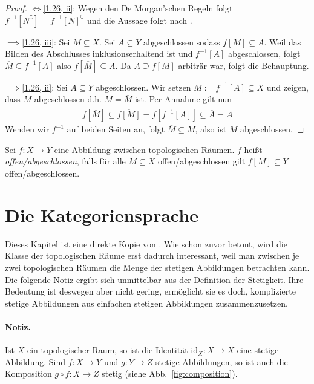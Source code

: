 \documentclass[
12pt, 
openany, 
a4paper, 
final,
fleqn, 
]{myclass}
\numberwithin{equation}{chapter}
\numberwithin{section}{chapter}
\newcommand{\implication}[2]{\glqq {#1}$\implies${#2}\grqq}
\newcommand{\doubleimplication}[2]{\glqq {#1}$\iff${#2}\grqq}
\newcommand{\closure}[1]{\overline{#1}}
\renewcommand{\cite}[2][]{}
\begin{document}
\begin{proof}
\doubleimplication{\ref{1.26, i}}{\ref{1.26, ii}}: Wegen den De Morgan'schen Regeln folgt $f^{-1}[N^\complement] = f^{-1}[N]^\complement$ und die Aussage folgt nach . 

\implication{\ref{1.26, ii}}{\ref{1.26, iii}}: Sei $M \subseteq X$. Sei $A\subseteq Y$ abgeschlossen sodass $f[M]\subseteq A$. Weil das Bilden des Abschlusses inklusionserhaltend ist und $f^{-1}[A]$ abgeschlossen, folgt $\closure{M} \subseteq f^{-1}[A]$ also $f[\closure{M}]\subseteq A$. Da $A\supseteq f[M]$ arbiträr war, folgt die Behauptung. 

\implication{\ref{1.26, iii}}{\ref{1.26, ii}}: Sei $A\subseteq Y$ abgeschlossen. Wir setzen $M:= f^{-1}[A]\subseteq X$ und zeigen, dass $M$ abgeschlossen d.h. $M=\closure{M}$ ist. Per Annahme gilt nun 
\begin{align*}
f[\closure{M}] \subseteq \closure{f[M]} = \closure{f[f^{-1}[A]]} \subseteq \closure{A} = A
\end{align*}
Wenden wir $f^{-1}$ auf beiden Seiten an, folgt $\closure{M} \subseteq M$, also ist $M$ abgeschlossen. \qedhere
\end{proof}

\begin{defn}
Sei $f: X\to Y$ eine Abbildung zwischen topologischen Räumen. $f$ heißt \emph{offen/abgeschlossen}, falls für alle $M\subseteq X$ offen/abgeschlossen gilt $f[M]\subseteq Y$ offen/abgeschlossen.
\end{defn}


\section{Die Kategoriensprache}

Dieses Kapitel ist eine direkte Kopie von \cite{laures_grundkurs_2023}.
Wie schon zuvor betont, wird die Klasse der topologischen Räume erst dadurch interessant, weil man zwischen je zwei topologischen Räumen die Menge der stetigen Abbildungen betrachten kann. Die folgende Notiz ergibt sich unmittelbar aus der Definition der Stetigkeit. Ihre Bedeutung ist deswegen aber nicht gering, ermöglicht sie es doch, komplizierte stetige Abbildungen aus einfachen stetigen Abbildungen zusammenzusetzen.

\paragraph{Notiz.} Ist \(X\) ein topologischer Raum, so ist die Identität \(\text{id}_X : X \to X\) eine stetige Abbildung. Sind \(f : X \to Y\) und \(g : Y \to Z\) stetige Abbildungen, so ist auch die Komposition \(g \circ f : X \to Z\) stetig (siehe Abb.~\ref{fig:composition}).
\end{document}

